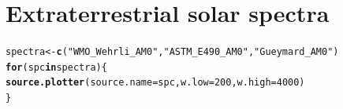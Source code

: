 \documentclass{article}\usepackage[]{graphicx}\usepackage[]{color}
\makeatletter
\newcommand{\hlnum}[1]{\textcolor[rgb]{0.686,0.059,0.569}{#1}}%
\newcommand{\hlstr}[1]{\textcolor[rgb]{0.192,0.494,0.8}{#1}}%
\newcommand{\hlstd}[1]{\textcolor[rgb]{0.345,0.345,0.345}{#1}}%
\newcommand{\hlkwa}[1]{\textcolor[rgb]{0.161,0.373,0.58}{\textbf{#1}}}%
\newcommand{\hlkwb}[1]{\textcolor[rgb]{0.69,0.353,0.396}{#1}}%
\newcommand{\hlkwc}[1]{\textcolor[rgb]{0.333,0.667,0.333}{#1}}%
\newcommand{\hlkwd}[1]{\textcolor[rgb]{0.737,0.353,0.396}{\textbf{#1}}}%
\newenvironment{kframe}{%
 \def\at@end@of@kframe{}%
 \ifinner\ifhmode%
  \def\at@end@of@kframe{\end{minipage}}%
  \begin{minipage}{\columnwidth}%
 \fi\fi%
 \def\FrameCommand##1{\hskip\@totalleftmargin \hskip-\fboxsep
 \colorbox{shadecolor}{##1}\hskip-\fboxsep
     \hskip-\linewidth \hskip-\@totalleftmargin \hskip\columnwidth}%
 \MakeFramed {\advance\hsize-\width
   \@totalleftmargin\z@ \linewidth\hsize
   \@setminipage}}%
 {\par\unskip\endMakeFramed%
 \at@end@of@kframe}
\newenvironment{knitrout}{}{} %
\makeatother
\begin{document}
\section{Extraterrestrial solar spectra}

\begin{knitrout}\footnotesize
{}\color{fgcolor}\begin{kframe}
\begin{alltt}
\hlstd{spectra} \hlkwb{<-} \hlkwd{c}\hlstd{(}\hlstr{"WMO_Wehrli_AM0"}\hlstd{,} \hlstr{"ASTM_E490_AM0"}\hlstd{,} \hlstr{"Gueymard_AM0"}\hlstd{)}
\hlkwa{for} \hlstd{(spc} \hlkwa{in} \hlstd{spectra) \{}
    \hlkwd{source.plotter}\hlstd{(}\hlkwc{source.name} \hlstd{= spc,} \hlkwc{w.low} \hlstd{=} \hlnum{200}\hlstd{,} \hlkwc{w.high} \hlstd{=} \hlnum{4000}\hlstd{)}
\hlstd{\}}
\end{alltt}
\end{kframe}


\end{knitrout}
\end{document}
